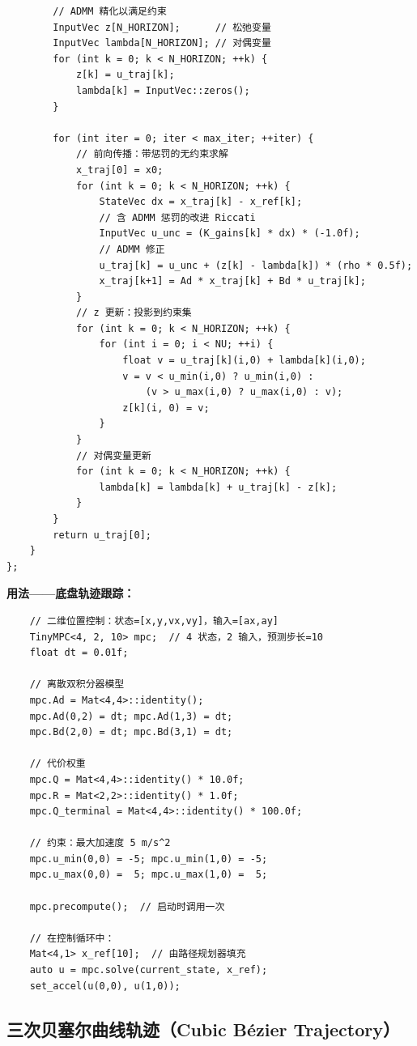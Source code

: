 \begin{verbatim}
        // ADMM 精化以满足约束
        InputVec z[N_HORIZON];      // 松弛变量
        InputVec lambda[N_HORIZON]; // 对偶变量
        for (int k = 0; k < N_HORIZON; ++k) {
            z[k] = u_traj[k];
            lambda[k] = InputVec::zeros();
        }

        for (int iter = 0; iter < max_iter; ++iter) {
            // 前向传播：带惩罚的无约束求解
            x_traj[0] = x0;
            for (int k = 0; k < N_HORIZON; ++k) {
                StateVec dx = x_traj[k] - x_ref[k];
                // 含 ADMM 惩罚的改进 Riccati
                InputVec u_unc = (K_gains[k] * dx) * (-1.0f);
                // ADMM 修正
                u_traj[k] = u_unc + (z[k] - lambda[k]) * (rho * 0.5f);
                x_traj[k+1] = Ad * x_traj[k] + Bd * u_traj[k];
            }
            // z 更新：投影到约束集
            for (int k = 0; k < N_HORIZON; ++k) {
                for (int i = 0; i < NU; ++i) {
                    float v = u_traj[k](i,0) + lambda[k](i,0);
                    v = v < u_min(i,0) ? u_min(i,0) :
                        (v > u_max(i,0) ? u_max(i,0) : v);
                    z[k](i, 0) = v;
                }
            }
            // 对偶变量更新
            for (int k = 0; k < N_HORIZON; ++k) {
                lambda[k] = lambda[k] + u_traj[k] - z[k];
            }
        }
        return u_traj[0];
    }
};
\end{verbatim}

\textbf{用法——底盘轨迹跟踪：}
\begin{verbatim}
    // 二维位置控制：状态=[x,y,vx,vy]，输入=[ax,ay]
    TinyMPC<4, 2, 10> mpc;  // 4 状态，2 输入，预测步长=10
    float dt = 0.01f;

    // 离散双积分器模型
    mpc.Ad = Mat<4,4>::identity();
    mpc.Ad(0,2) = dt; mpc.Ad(1,3) = dt;
    mpc.Bd(2,0) = dt; mpc.Bd(3,1) = dt;

    // 代价权重
    mpc.Q = Mat<4,4>::identity() * 10.0f;
    mpc.R = Mat<2,2>::identity() * 1.0f;
    mpc.Q_terminal = Mat<4,4>::identity() * 100.0f;

    // 约束：最大加速度 5 m/s^2
    mpc.u_min(0,0) = -5; mpc.u_min(1,0) = -5;
    mpc.u_max(0,0) =  5; mpc.u_max(1,0) =  5;

    mpc.precompute();  // 启动时调用一次

    // 在控制循环中：
    Mat<4,1> x_ref[10];  // 由路径规划器填充
    auto u = mpc.solve(current_state, x_ref);
    set_accel(u(0,0), u(1,0));
\end{verbatim}

\subsection{三次贝塞尔曲线轨迹（Cubic B\'{e}zier Trajectory）}

